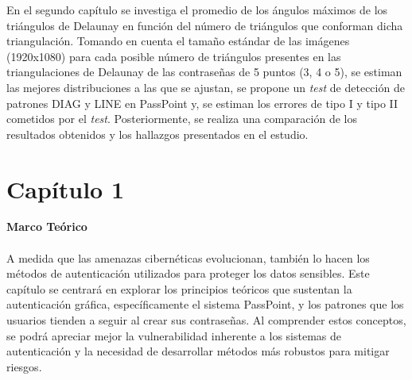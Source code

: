 \documentclass[12pt]{report}
\begin{document}
	En el segundo capítulo se investiga el promedio de los ángulos máximos de los triángulos de Delaunay en función del número de triángulos que conforman dicha triangulación. Tomando en cuenta el tamaño estándar de las imágenes (1920x1080) para cada posible número de triángulos presentes en las triangulaciones de Delaunay de las contraseñas de 5 puntos (3, 4 o 5), se estiman las  mejores distribuciones a las que se ajustan, se propone un \textit{test} de detección de patrones DIAG y LINE en PassPoint y, se estiman los errores de tipo I y tipo II cometidos por el \textit{test}. Posteriormente, se realiza una comparación de los resultados obtenidos y los hallazgos presentados en el estudio\cite{13}.
	
	
	
	
	

\setcounter{chapter}{1}

\chapter*{\LARGE{Capítulo 1}}
\vspace{-2em} %
\noindent\textbf{\LARGE Marco Teórico}\\
\vspace{2em}
\\
 A medida que las amenazas cibernéticas evolucionan, también lo hacen los métodos de autenticación utilizados para proteger los datos sensibles. Este capítulo se centrará en explorar los principios teóricos que sustentan la autenticación gráfica, específicamente el sistema PassPoint, y los patrones que los usuarios tienden a seguir al crear sus contraseñas. Al comprender estos conceptos, se podrá apreciar mejor la vulnerabilidad inherente a los sistemas de autenticación y la necesidad de desarrollar métodos más robustos para mitigar riesgos.
\end{document}
